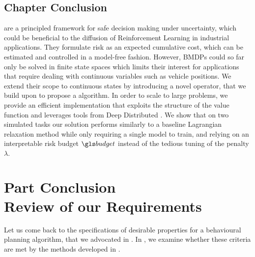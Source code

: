 \section*{Chapter Conclusion}
\label{sec:conclusion}
 are a principled framework for safe decision making under uncertainty, which could be beneficial to the diffusion of Reinforcement Learning in industrial applications. They formulate risk as an expected cumulative cost, which can be estimated and controlled in a model-free fashion. However, \glspl{BMDP} could so far only be solved in finite state spaces which limits their interest for  applications that require dealing with continuous variables such as vehicle positions. We extend their scope to continuous states by introducing a novel  operator, that we build upon to propose a  algorithm. In order to scale to large problems, we provide an efficient implementation that exploits the structure of the value function and leverages tools from Deep Distributed . We show that on two simulated tasks our solution performs similarly to a baseline Lagrangian relaxation method while only requiring a single model to train, and relying on an interpretable risk budget $\budget$ instead of the tedious tuning of the penalty $\lambda$.

%
%


\chapter*{Part Conclusion\\ {\LARGE Review of our Requirements}}

Let us come back to the specifications of desirable properties for a behavioural planning algorithm, that we advocated in . In , we examine whether these criteria are met by the methods developed in .

